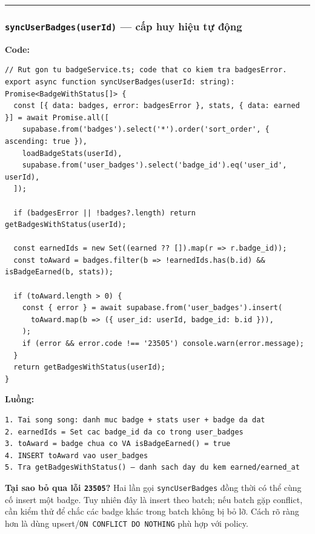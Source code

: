 \documentclass[12pt,a4paper]{article}
\begin{document}
\begin{center}\rule{0.5\linewidth}{0.5pt}\end{center}

\subsubsection{\texorpdfstring{\texttt{syncUserBadges(userId)} --- cấp
huy hiệu tự
động}{syncUserBadges(userId) --- cấp huy hiệu tự động}}\label{syncuserbadgesuserid-cux1ea5p-huy-hiux1ec7u-tux1ef1-ux111ux1ed9ng}

\textbf{Code:}

\begin{verbatim}
// Rut gon tu badgeService.ts; code that co kiem tra badgesError.
export async function syncUserBadges(userId: string): Promise<BadgeWithStatus[]> {
  const [{ data: badges, error: badgesError }, stats, { data: earned }] = await Promise.all([
    supabase.from('badges').select('*').order('sort_order', { ascending: true }),
    loadBadgeStats(userId),
    supabase.from('user_badges').select('badge_id').eq('user_id', userId),
  ]);

  if (badgesError || !badges?.length) return getBadgesWithStatus(userId);

  const earnedIds = new Set((earned ?? []).map(r => r.badge_id));
  const toAward = badges.filter(b => !earnedIds.has(b.id) && isBadgeEarned(b, stats));

  if (toAward.length > 0) {
    const { error } = await supabase.from('user_badges').insert(
      toAward.map(b => ({ user_id: userId, badge_id: b.id })),
    );
    if (error && error.code !== '23505') console.warn(error.message);
  }
  return getBadgesWithStatus(userId);
}

\end{verbatim}

\textbf{Luồng:}

\begin{verbatim}
1. Tai song song: danh muc badge + stats user + badge da dat
2. earnedIds = Set cac badge_id da co trong user_badges
3. toAward = badge chua co VA isBadgeEarned() = true
4. INSERT toAward vao user_badges
5. Tra getBadgesWithStatus() — danh sach day du kem earned/earned_at
\end{verbatim}

\textbf{Tại sao bỏ qua lỗi \texttt{23505}?} Hai lần gọi
\texttt{syncUserBadges} đồng thời có thể cùng cố insert một badge. Tuy
nhiên đây là insert theo batch; nếu batch gặp conflict, cần kiểm thử để
chắc các badge khác trong batch không bị bỏ lỡ. Cách rõ ràng hơn là dùng
upsert/\texttt{ON\ CONFLICT\ DO\ NOTHING} phù hợp với policy.
\end{document}
